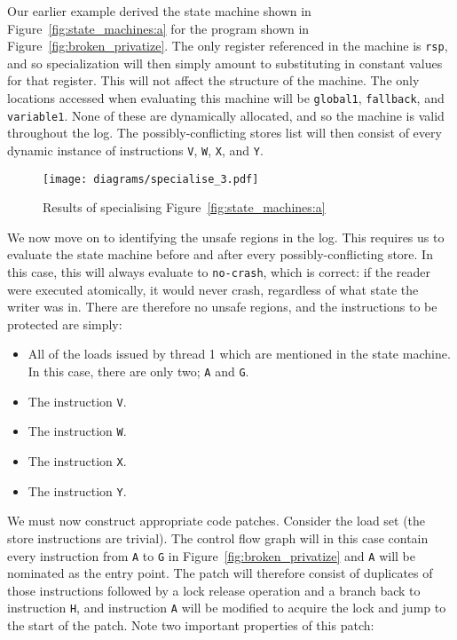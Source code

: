 \documentclass[10pt,letter,twocolumn]{sigplanconf}
\begin{document}
Our earlier example derived the state machine shown in
Figure~\ref{fig:state_machines:a} for the program shown in
Figure~\ref{fig:broken_privatize}.  The only register referenced in
the machine is \verb|rsp|, and so specialization will then simply
amount to substituting in constant values for that register.  This
will not affect the structure of the machine.  The only locations
accessed when evaluating this machine will be \verb|global1|,
\verb|fallback|, and \verb|variable1|.  None of these are dynamically
allocated, and so the machine is valid throughout the log.  The
possibly-conflicting stores list will then consist of every dynamic
instance of instructions \verb|V|, \verb|W|, \verb|X|, and \verb|Y|.

\begin{figure}[thb]
\texttt{[image: diagrams/specialise\_3.pdf]}
\caption{Results of specialising Figure~\ref{fig:state_machines:a}}
\label{fig:specialised_example_machine}
\end{figure}

We now move on to identifying the unsafe regions in the log.  This
requires us to evaluate the state machine before and after every
possibly-conflicting store.  In this case, this will always evaluate
to \verb|no-crash|, which is correct: if the reader were executed
atomically, it would never crash, regardless of what state the writer
was in.  There are therefore no unsafe regions, and the instructions
to be protected are simply:

\begin{itemize}
\item All of the loads issued by thread 1 which are mentioned in the
  state machine.  In this case, there are only two; \verb|A| and
  \verb|G|.
\item The instruction \verb|V|.
\item The instruction \verb|W|.
\item The instruction \verb|X|.
\item The instruction \verb|Y|.
\end{itemize}

We must now construct appropriate code patches.  Consider the load set
(the store instructions are trivial).  The control flow graph will in
this case contain every instruction from \verb|A| to \verb|G| in
Figure~\ref{fig:broken_privatize} and \verb|A| will be nominated as
the entry point.  The patch will therefore consist of duplicates of
those instructions followed by a lock release operation and a branch
back to instruction \verb|H|, and instruction \verb|A| will be
modified to acquire the lock and jump to the start of the patch.  Note
two important properties of this patch:
\end{document}
